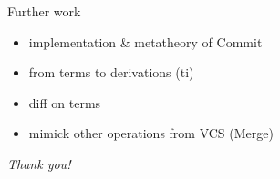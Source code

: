 \documentclass[ignorenonframetext,red]{beamer}
\begin{document}
\begin{frame}{Further work}
  \begin{itemize}
  \item implementation \& metatheory of \textsf{Commit}
  \item from terms to derivations (\textsf{ti})
  \item \textsf{diff} on terms
  \item mimick other operations from VCS (\textsf{Merge})
  \end{itemize}
  \vspace{2em}
  \pause
  \begin{center}
    \Large\em Thank you!
  \end{center}
\end{frame}
\end{document}
